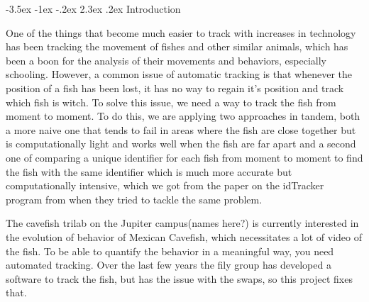\documentclass{article}
\makeatletter
\renewcommand\section{\clearpage\newpage\@startsection {section}{1}{\z@}%
	{-3.5ex \@plus -1ex \@minus -.2ex}%
	{2.3ex \@plus.2ex}%
	{\normalfont\Large\bfseries}}
\makeatother
\begin{document}
\singlespace
\newpage

\setlength{\parindent}{1em}



\section{Introduction}
\label{introduction}

One of the things that become much easier to track with increases in technology has been tracking the movement of fishes and other similar animals, which has been a boon for the analysis of their movements and behaviors, especially schooling. However, a common issue of automatic tracking is that whenever the position of a fish has been lost, it has no way to regain it's position and track which fish is witch. To solve this issue, we need a way to track the fish from moment to moment. To do this, we are applying two approaches in tandem, both a more naive one that tends to fail in areas where the fish are close together but is computationally light and works well when the fish are far apart and a second one of comparing a unique identifier for each fish from moment to moment to find the fish with the same identifier which is much more accurate but computationally intensive, which we got from the paper on the idTracker program from when they tried to tackle the same problem. 

The cavefish trilab on the Jupiter campus(names here?) is currently interested in the evolution of behavior of Mexican Cavefish, which necessitates a lot of video of the fish. To be able to quantify the behavior in a meaningful way, you need automated tracking. Over the last few years the fily group has developed a software to track the fish, but has the issue with the swaps, so this project fixes that.
\end{document}
